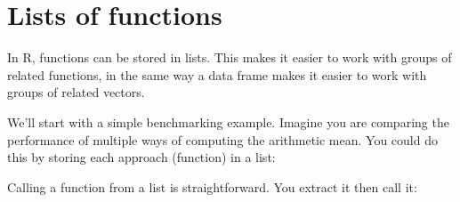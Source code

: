 \begin{enumerate}
\begin{Shaded}
\begin{Highlighting}[]
\NormalTok{(}\NormalTok{))}
\NormalTok{(x) x[[}\NormalTok{]])}
\end{Highlighting}
\end{Shaded}
\end{enumerate}

\hypertarget{lists-of-functions}{%
\section{Lists of functions}\label{lists-of-functions}}

In R, functions can be stored in lists. This makes it easier to work
with groups of related functions, in the same way a data frame makes it
easier to work with groups of related vectors.

We'll start with a simple benchmarking example. Imagine you are
comparing the performance of multiple ways of computing the arithmetic
mean. You could do this by storing each approach (function) in a list:

\begin{Shaded}
\begin{Highlighting}[]
\StringTok{ }\NormalTok{(}
   
   \OperatorTok{/}\StringTok{ }
   
\StringTok{ }
\StringTok{ }
     
\StringTok{ }\OperatorTok{+}\StringTok{ }\OperatorTok{/}\StringTok{ }
\NormalTok{    \}}
\NormalTok{  \}}
\NormalTok{)}
\end{Highlighting}
\end{Shaded}

Calling a function from a list is straightforward. You extract it then
call it:

